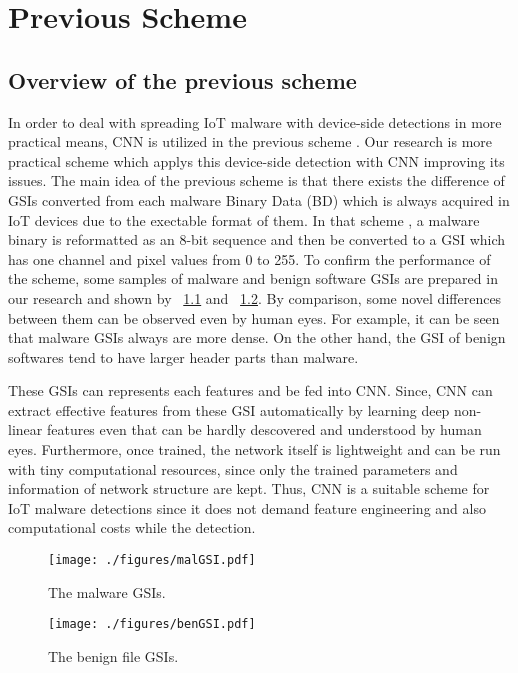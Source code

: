 \chapter{Previous Scheme}\label{sec:previous_scheme}
\section{Overview of the previous scheme} 
In order to deal with spreading IoT malware with device-side detections in more practical means, CNN is utilized in the previous scheme \cite{previous}.
Our research is more practical scheme which applys this device-side detection with CNN improving its issues.
The main idea of the previous scheme is that there exists the difference of GSIs converted from each malware Binary Data (BD) which is always acquired in IoT devices due to the exectable format of them.
In that scheme \cite{previous}, a malware binary is reformatted as an 8-bit sequence and then be converted to a GSI which has one channel and pixel values from 0 to 255.
To confirm the performance of the scheme, some samples of malware and benign software GSIs are prepared in our research and shown by \figurename~\ref{fig:malGSI} and \figurename~\ref{fig:benGSI}.
By comparison, some novel differences between them can be observed even by human eyes.
For example, it can be seen that malware GSIs always are more dense.
On the other hand, the GSI of benign softwares tend to have larger header parts than malware.

These GSIs can represents each features and be fed into CNN.
Since, CNN can extract effective features from these GSI automatically by learning deep non-linear features even that can be hardly descovered and understood by human eyes.
Furthermore, once trained, the network itself is lightweight and can be run with tiny computational resources, since only the trained parameters and information of network structure are kept.
Thus, CNN is a suitable scheme for IoT malware detections since it does not demand feature engineering and also computational costs while the detection.

\begin{figure}[h]
 \centering
 \texttt{[image: ./figures/malGSI.pdf]}
 \caption{The malware GSIs.} 
 \label{fig:malGSI}
\end{figure}
\begin{figure}[h]
 \centering
 \texttt{[image: ./figures/benGSI.pdf]}
 \caption{The benign file GSIs.} 
 \label{fig:benGSI}
\end{figure}


